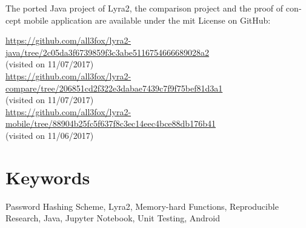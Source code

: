 \begin{otherlanguage}{english}
The ported Java project of Lyra2, the comparison project and the proof of concept mobile application are available under the \gls{mit} License on GitHub:

\url{https://github.com/all3fox/lyra2-java/tree/2c05da3f6739859f3c3abe5116754666689028a2}
\\(visited on 11/07/2017)\\
\url{https://github.com/all3fox/lyra2-compare/tree/206851cd2f322e3dabae7439c7f9f75bef81d3a1}
\\(visited on 11/07/2017)\\
\url{https://github.com/all3fox/lyra2-mobile/tree/88904b25fc5f637f8c3ec14eec4bce88db176b41}
\\(visited on 11/06/2017)

\bigskip

\section*{Keywords}
Password Hashing Scheme, Lyra2, Memory-hard Functions, Reproducible Research, Java, Jupyter Notebook, Unit Testing, Android

\end{otherlanguage}
